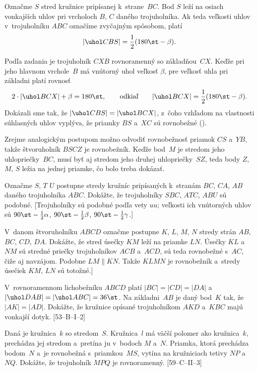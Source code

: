 {%
Označme $S$ stred kružnice pripísanej k~strane~$BC$. Bod $S$ leží na osiach vonkajších uhlov pri vrcholoch $B$, $C$ daného trojuholníka. Ak teda veľkosti uhlov v~trojuholníku $ABC$ označíme zvyčajným spôsobom, platí
$$
|\uhol CBS|=\frac12(180\st-\beta).
$$

Podľa zadania je trojuholník $CXB$ rovnoramenný so základňou~$CX$. Keďže pri jeho hlavnom vrchole~$B$ má vnútorný uhol veľkosť $\beta$, pre veľkosť uhla pri základni platí rovnosť
$$
2\cdot|\uhol BCX|+\beta=180\st,\qquad\text{odkiaľ}\qquad |\uhol BCX|=\frac12(180\st-\beta).
$$
Dokázali sme tak, že $|\uhol CBS|=|\uhol BCX|$, z~čoho vzhľadom na vlastnosti súhlasných uhlov vyplýva, že priamky $BS$ a~$XC$ sú rovnobežné (\obr).

Zrejme analogickým postupom možno odvodiť rovnobežnosť priamok $CS$ a~$YB$, takže štvoruholník $BSCZ$ je rovnobežník. Keďže bod~$M$ je stredom jeho uhlopriečky~$BC$, musí byť aj stredom jeho druhej uhlopriečky~$SZ$, teda body $Z$, $M$, $S$ ležia na jednej priamke, čo bolo treba dokázať.


Označme $S$, $T$ $U$ postupne stredy kružníc pripísaných k~stranám $BC$, $CA$, $AB$ daného trojuholníka $ABC$. Dokážte, že trojuholníky $SBC$, $ATC$, $ABU$ sú podobné. [Trojuholníky sú podobné podľa vety $uu$; veľkosti ich vnútorných uhlov sú $90\st-\frac12\alpha$, $90\st-\frac12\beta$, $90\st-\frac12\gamma$.]

V~danom štvoruholníku $ABCD$ označme postupne $K$, $L$, $M$, $N$ stredy strán $AB$, $BC$, $CD$, $DA$. Dokážte, že stred úsečky $KM$ leží na priamke $LN$. Úsečky $KL$ a~$NM$ sú stredné priečky trojuholníkov $ACB$ a~$ACD$, sú teda rovnobežné s~$AC$, čiže aj navzájom. Podobne $LM\parallel KN$. Takže $KLMN$ je rovnobežník a~stredy úsečiek $KM$, $LN$ sú totožné.]

\D
V~rovnoramennom lichobežníku $ABCD$ platí $|BC|=|CD|=|DA|$
a~$|\uhol DAB|=|\uhol ABC|=36\st$. Na základni~$AB$ je daný bod~$K$
tak, že $|AK|=|AD|$. Dokážte, že kružnice opísané trojuholníkom $AKD$
a~$KBC$ majú vonkajší dotyk.
[53--B--I--2]

Daná je kružnica~$k$ so stredom~$S$. Kružnica~$l$ má väčší polomer ako
kružnica~$k$, prechádza jej stredom a~pretína ju v~bodoch $M$ a~$N$.
Priamka, ktorá prechádza bodom~$N$ a~je rovnobežná s~priamkou~$MS$, vytína na kružniciach
tetivy $NP$ a~$NQ$. Dokážte, že trojuholník $MPQ$ je rovnoramenný.
[59--C--II--3]

}

